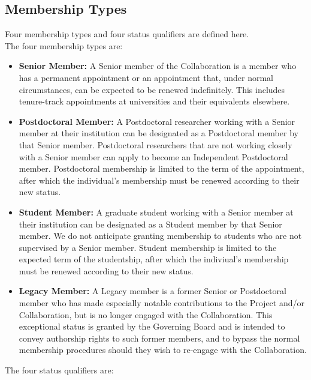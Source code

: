 \documentclass[12pt]{article}
\begin{document}
\subsection{Membership Types}
\label{sec:memtypes}

Four membership types and four status qualifiers are defined here. \\

\noindent The four membership types are:
\begin{itemize}

\item {\bf Senior Member:} 
A Senior member of the Collaboration is a member who has a permanent appointment or an appointment that, under normal circumstances, can be expected to be renewed indefinitely.  This includes tenure-track appointments at universities and their equivalents elsewhere.  

\item {\bf Postdoctoral Member:} 
A Postdoctoral researcher working with a Senior member at their institution can be designated as a Postdoctoral member by that Senior member. Postdoctoral researchers that are not working closely with a Senior member can apply to become an Independent Postdoctoral member. Postdoctoral membership is limited to the term of the appointment, after which the individual's membership must be renewed according to their new status.

\item {\bf Student Member:} 
A graduate student working with a Senior member at their institution can be designated as a Student member by that Senior member.  We do not anticipate granting membership to students who are not supervised by a Senior member. Student membership is limited to the expected term of the studentship, after which the indiviual's membership must be renewed according to their new status.

\item {\bf Legacy Member:}  
A Legacy member is a former Senior or Postdoctoral member who has made especially notable contributions to the Project and/or Collaboration, but is no longer engaged with the Collaboration. This exceptional status is granted by the Governing Board and is intended to convey authorship rights to such former members, and to bypass the normal membership procedures should they wish to re-engage with the Collaboration.

\end{itemize}

\vspace*{0.1in}
\noindent
The four status qualifiers are:
\end{document}
